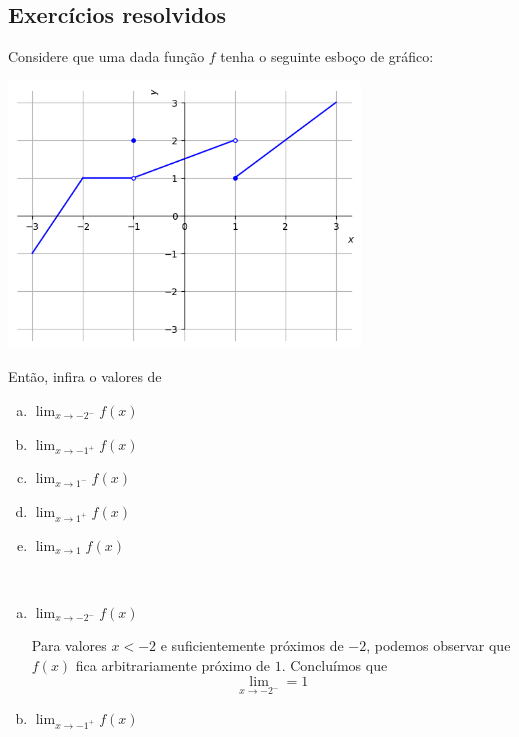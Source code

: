 \cleardoublepage\documentclass[../main.tex]{subfiles}
\begin{document}
\subsection{Exercícios resolvidos}

\begin{exeresol}
  Considere que uma dada função $f$ tenha o seguinte esboço de gráfico:

  \begin{center}
    \includegraphics[width=0.7\textwidth]{fig_lim/fig_exeresol_nocaolim}
  \end{center}

  Então, infira o valores de
  \begin{multicols}{3}
  \begin{enumerate}[a)]
  \item $\displaystyle \lim_{x\to -2^-} f(x)$
  \item $\displaystyle \lim_{x\to -1^+} f(x)$
  \item $\displaystyle \lim_{x\to 1^-} f(x)$
  \item $\displaystyle \lim_{x\to 1^+} f(x)$
  \item $\displaystyle \lim_{x\to 1} f(x)$
  \end{enumerate}\end{multicols}
  \begin{resol}~
  \begin{enumerate}[a)]
  \item $\displaystyle \lim_{x\to -2^-} f(x)$

    Para valores $x<-2$ e suficientemente próximos de $-2$, podemos observar que $f(x)$ fica arbitrariamente próximo de $1$. Concluímos que
    \begin{equation*}
      \lim_{x\to -2^-} = 1
    \end{equation*}

  \item $\displaystyle \lim_{x\to -1^+} f(x)$


\end{enumerate}
\end{resol}
\end{exeresol}
\end{document}
